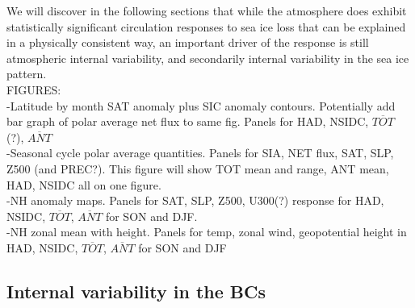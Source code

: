 \documentclass[twocol]{ametsoc}
\begin{document}
We will discover in the following sections that while the atmosphere does exhibit statistically significant circulation responses to sea ice loss that can be explained in a physically consistent way, an important driver of the response is still atmospheric internal variability, and secondarily internal variability in the sea ice pattern.\\

FIGURES:\\
-Latitude by month SAT anomaly plus SIC anomaly contours. Potentially add bar graph of polar average net flux to same fig. Panels for HAD, NSIDC, $\overline{TOT}$ (?), $\overline{ANT}$\\
-Seasonal cycle polar average quantities. Panels for SIA, NET flux, SAT, SLP, Z500 (and PREC?). This figure will show TOT mean and range, ANT mean, HAD, NSIDC all on one figure.\\
-NH anomaly maps. Panels for SAT, SLP, Z500, U300(?) response for HAD, NSIDC, $\overline{TOT}$, $\overline{ANT}$ for SON and DJF.\\
-NH zonal mean with height. Panels for temp, zonal wind, geopotential height in HAD, NSIDC, $\overline{TOT}$, $\overline{ANT}$ for SON and DJF \\

\subsection{Internal variability in the BCs}
\end{document}
